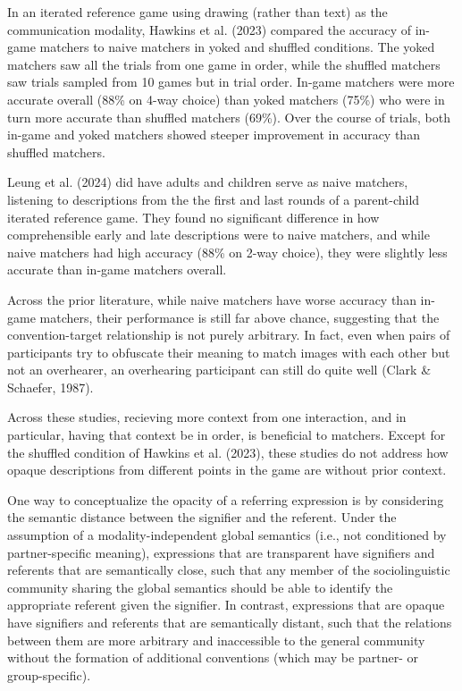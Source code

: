 \documentclass[10pt, letterpaper]{article}
\begin{document}
In an iterated reference game using drawing (rather than text) as the
communication modality, Hawkins et al. (2023) compared the accuracy of
in-game matchers to naive matchers in yoked and shuffled conditions. The
yoked matchers saw all the trials from one game in order, while the
shuffled matchers saw trials sampled from 10 games but in trial order.
In-game matchers were more accurate overall (88\% on 4-way choice) than
yoked matchers (75\%) who were in turn more accurate than shuffled
matchers (69\%). Over the course of trials, both in-game and yoked
matchers showed steeper improvement in accuracy than shuffled matchers.

Leung et al. (2024) did have adults and children serve as naive
matchers, listening to descriptions from the the first and last rounds
of a parent-child iterated reference game. They found no significant
difference in how comprehensible early and late descriptions were to
naive matchers, and while naive matchers had high accuracy (88\% on
2-way choice), they were slightly less accurate than in-game matchers
overall.

Across the prior literature, while naive matchers have worse accuracy
than in-game matchers, their performance is still far above chance,
suggesting that the convention-target relationship is not purely
arbitrary. In fact, even when pairs of participants try to obfuscate
their meaning to match images with each other but not an overhearer, an
overhearing participant can still do quite well (Clark \& Schaefer,
1987).

Across these studies, recieving more context from one interaction, and
in particular, having that context be in order, is beneficial to
matchers. Except for the shuffled condition of Hawkins et al. (2023),
these studies do not address how opaque descriptions from different
points in the game are without prior context.

One way to conceptualize the opacity of a referring expression is by
considering the semantic distance between the signifier and the
referent. Under the assumption of a modality-independent global
semantics (i.e., not conditioned by partner-specific meaning),
expressions that are transparent have signifiers and referents that are
semantically close, such that any member of the sociolinguistic
community sharing the global semantics should be able to identify the
appropriate referent given the signifier. In contrast, expressions that
are opaque have signifiers and referents that are semantically distant,
such that the relations between them are more arbitrary and inaccessible
to the general community without the formation of additional conventions
(which may be partner- or group-specific).
\end{document}
